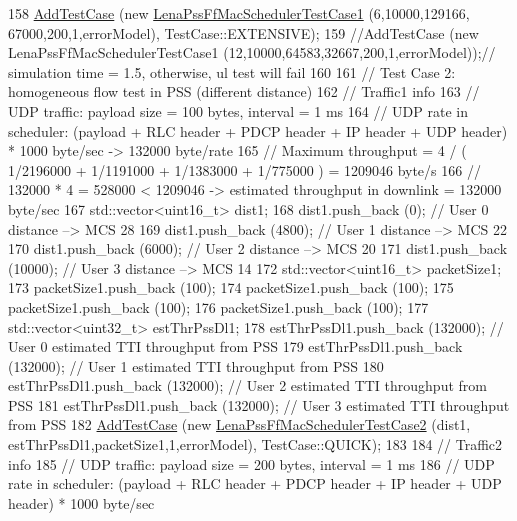 \begin{DoxyCode}
158   \hyperlink{classns3_1_1TestCase_a3718088e3eefd5d6454569d2e0ddd835}{AddTestCase} (\textcolor{keyword}{new} \hyperlink{classLenaPssFfMacSchedulerTestCase1}{LenaPssFfMacSchedulerTestCase1} (6,10000,129166,
      67000,200,1,errorModel), TestCase::EXTENSIVE);
159   \textcolor{comment}{//AddTestCase (new LenaPssFfMacSchedulerTestCase1 (12,10000,64583,32667,200,1,errorModel));// simulation
       time = 1.5, otherwise, ul test will fail}
160 
161   \textcolor{comment}{// Test Case 2: homogeneous flow test in PSS (different distance)}
162   \textcolor{comment}{// Traffic1 info}
163   \textcolor{comment}{//   UDP traffic: payload size = 100 bytes, interval = 1 ms}
164   \textcolor{comment}{//   UDP rate in scheduler: (payload + RLC header + PDCP header + IP header + UDP header) * 1000 byte/sec
       -> 132000 byte/rate }
165   \textcolor{comment}{// Maximum throughput = 4 / ( 1/2196000 + 1/1191000 + 1/1383000 + 1/775000 ) = 1209046 byte/s}
166   \textcolor{comment}{// 132000 * 4 = 528000 < 1209046 -> estimated throughput in downlink = 132000 byte/sec}
167   std::vector<uint16\_t> dist1;
168   dist1.push\_back (0);       \textcolor{comment}{// User 0 distance --> MCS 28}
169   dist1.push\_back (4800);    \textcolor{comment}{// User 1 distance --> MCS 22}
170   dist1.push\_back (6000);    \textcolor{comment}{// User 2 distance --> MCS 20}
171   dist1.push\_back (10000);   \textcolor{comment}{// User 3 distance --> MCS 14}
172   std::vector<uint16\_t> packetSize1;
173   packetSize1.push\_back (100);
174   packetSize1.push\_back (100);
175   packetSize1.push\_back (100);
176   packetSize1.push\_back (100);
177   std::vector<uint32\_t> estThrPssDl1;
178   estThrPssDl1.push\_back (132000); \textcolor{comment}{// User 0 estimated TTI throughput from PSS}
179   estThrPssDl1.push\_back (132000); \textcolor{comment}{// User 1 estimated TTI throughput from PSS}
180   estThrPssDl1.push\_back (132000); \textcolor{comment}{// User 2 estimated TTI throughput from PSS}
181   estThrPssDl1.push\_back (132000); \textcolor{comment}{// User 3 estimated TTI throughput from PSS}
182   \hyperlink{classns3_1_1TestCase_a3718088e3eefd5d6454569d2e0ddd835}{AddTestCase} (\textcolor{keyword}{new} \hyperlink{classLenaPssFfMacSchedulerTestCase2}{LenaPssFfMacSchedulerTestCase2} (dist1,
      estThrPssDl1,packetSize1,1,errorModel), TestCase::QUICK);
183 
184   \textcolor{comment}{// Traffic2 info}
185   \textcolor{comment}{//   UDP traffic: payload size = 200 bytes, interval = 1 ms}
186   \textcolor{comment}{//   UDP rate in scheduler: (payload + RLC header + PDCP header + IP header + UDP header) * 1000 byte/sec
}
\end{DoxyCode}
